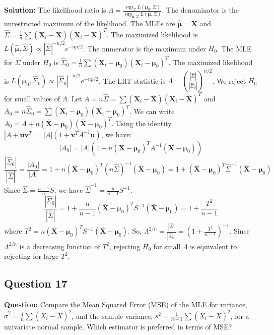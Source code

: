 \textbf{Solution:}
The likelihood ratio is $\Lambda = \frac{\sup_{\Sigma} L(\boldsymbol{\mu}_0, \Sigma)}{\sup_{\boldsymbol{\mu}, \Sigma} L(\boldsymbol{\mu}, \Sigma)}$.
The denominator is the unrestricted maximum of the likelihood. The MLEs are $\hat{\boldsymbol{\mu}} = \bar{\mathbf{X}}$ and $\hat{\Sigma} = \frac{1}{n}\sum(\mathbf{X}_i-\bar{\mathbf{X}})(\mathbf{X}_i-\bar{\mathbf{X}})^T$. The maximized likelihood is $L(\hat{\boldsymbol{\mu}}, \hat{\Sigma}) \propto |\hat{\Sigma}|^{-n/2} e^{-np/2}$.
The numerator is the maximum under $H_0$. The MLE for $\Sigma$ under $H_0$ is $\hat{\Sigma}_0 = \frac{1}{n}\sum(\mathbf{X}_i-\boldsymbol{\mu}_0)(\mathbf{X}_i-\boldsymbol{\mu}_0)^T$. The maximized likelihood is $L(\boldsymbol{\mu}_0, \hat{\Sigma}_0) \propto |\hat{\Sigma}_0|^{-n/2} e^{-np/2}$.
The LRT statistic is $\Lambda = \left(\frac{|\hat{\Sigma}|}{|\hat{\Sigma}_0|}\right)^{n/2}$. We reject $H_0$ for small values of $\Lambda$.
Let $A = n\hat{\Sigma} = \sum(\mathbf{X}_i-\bar{\mathbf{X}})(\mathbf{X}_i-\bar{\mathbf{X}})^T$ and $A_0 = n\hat{\Sigma}_0 = \sum(\mathbf{X}_i-\boldsymbol{\mu}_0)(\mathbf{X}_i-\boldsymbol{\mu}_0)^T$.
We can write $A_0 = A + n(\bar{\mathbf{X}}-\boldsymbol{\mu}_0)(\bar{\mathbf{X}}-\boldsymbol{\mu}_0)^T$.
Using the identity $|A+\mathbf{u}\mathbf{v}^T| = |A|(1 + \mathbf{v}^T A^{-1} \mathbf{u})$, we have:
$$ |A_0| = |A|(1 + n(\bar{\mathbf{X}}-\boldsymbol{\mu}_0)^T A^{-1} (\bar{\mathbf{X}}-\boldsymbol{\mu}_0)) $$
$$ \frac{|\hat{\Sigma}_0|}{|\hat{\Sigma}|} = \frac{|A_0|}{|A|} = 1 + n(\bar{\mathbf{X}}-\boldsymbol{\mu}_0)^T (n\hat{\Sigma})^{-1} (\bar{\mathbf{X}}-\boldsymbol{\mu}_0) = 1 + (\bar{\mathbf{X}}-\boldsymbol{\mu}_0)^T \hat{\Sigma}^{-1} (\bar{\mathbf{X}}-\boldsymbol{\mu}_0) $$
Since $\hat{\Sigma} = \frac{n-1}{n} S$, we have $\hat{\Sigma}^{-1} = \frac{n}{n-1} S^{-1}$.
$$ \frac{|\hat{\Sigma}_0|}{|\hat{\Sigma}|} = 1 + \frac{n}{n-1}(\bar{\mathbf{X}}-\boldsymbol{\mu}_0)^T S^{-1} (\bar{\mathbf{X}}-\boldsymbol{\mu}_0) = 1 + \frac{T^2}{n-1} $$
where $T^2 = n(\bar{\mathbf{X}}-\boldsymbol{\mu}_0)^T S^{-1} (\bar{\mathbf{X}}-\boldsymbol{\mu}_0)$.
So, $\Lambda^{2/n} = \frac{|\hat{\Sigma}|}{|\hat{\Sigma}_0|} = \left(1 + \frac{T^2}{n-1}\right)^{-1}$.
Since $\Lambda^{2/n}$ is a decreasing function of $T^2$, rejecting $H_0$ for small $\Lambda$ is equivalent to rejecting for large $T^2$.

\subsection*{Question 17}
\textbf{Question:} Compare the Mean Squared Error (MSE) of the MLE for variance, $\hat{\sigma}^2 = \frac{1}{n}\sum(X_i-\bar{X})^2$, and the sample variance, $s^2 = \frac{1}{n-1}\sum(X_i-\bar{X})^2$, for a univariate normal sample. Which estimator is preferred in terms of MSE?

